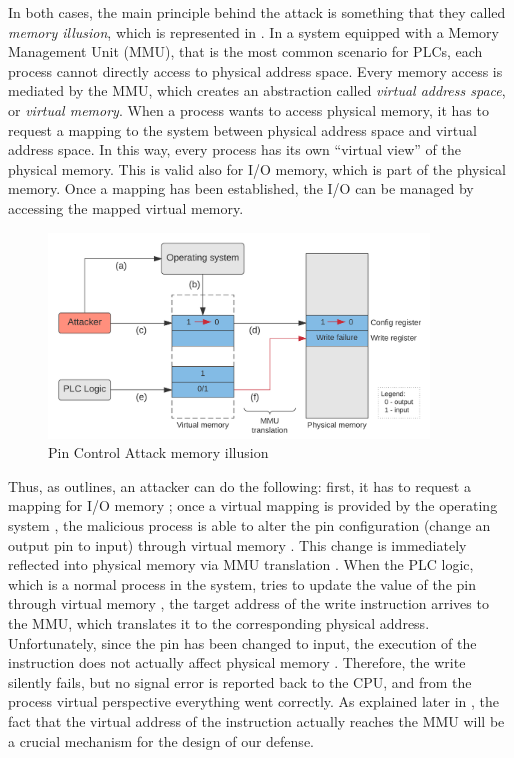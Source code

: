 In both cases, the main principle behind the attack is something that they called \emph{memory illusion}, which is represented in .
In a system equipped with a Memory Management Unit (MMU), that is the most common scenario for PLCs, each process cannot directly access to physical address space.
Every memory access is mediated by the MMU, which creates an abstraction called \emph{virtual address space}, or \emph{virtual memory}.
When a process wants to access physical memory, it has to request a mapping to the system between physical address space and virtual address space.
In this way, every process has its own ``virtual view'' of the physical memory. This is valid also for I/O memory, which is part of the physical memory.
Once a mapping has been established, the I/O can be managed by accessing the mapped virtual memory.
\begin{figure}[h]
\centerline{
\includegraphics[width=0.9\textwidth]{res/illusion}}
\caption{Pin Control Attack memory illusion \label{fig:illusion}}
\end{figure}
Thus, as  outlines, an attacker can do the following: first, it has to request a mapping for I/O memory ;
once a virtual mapping is provided by the operating system , the malicious process is able to alter the pin configuration (\eg change an output pin to input)
through virtual memory . This change is immediately reflected into physical memory via MMU translation . When the PLC logic,
which is a normal process in the system, tries to update the value of the pin through virtual memory ,
the target address of the write instruction arrives to the MMU, which translates it to the corresponding physical address.
Unfortunately, since the pin has been changed to input, the execution of the instruction does not actually affect physical memory .
Therefore, the write silently fails, but no signal error is reported back to the CPU, and from the process virtual perspective everything went correctly.
As explained later in , the fact that the virtual address of the instruction actually reaches the MMU will be a crucial mechanism
for the design of our defense.

